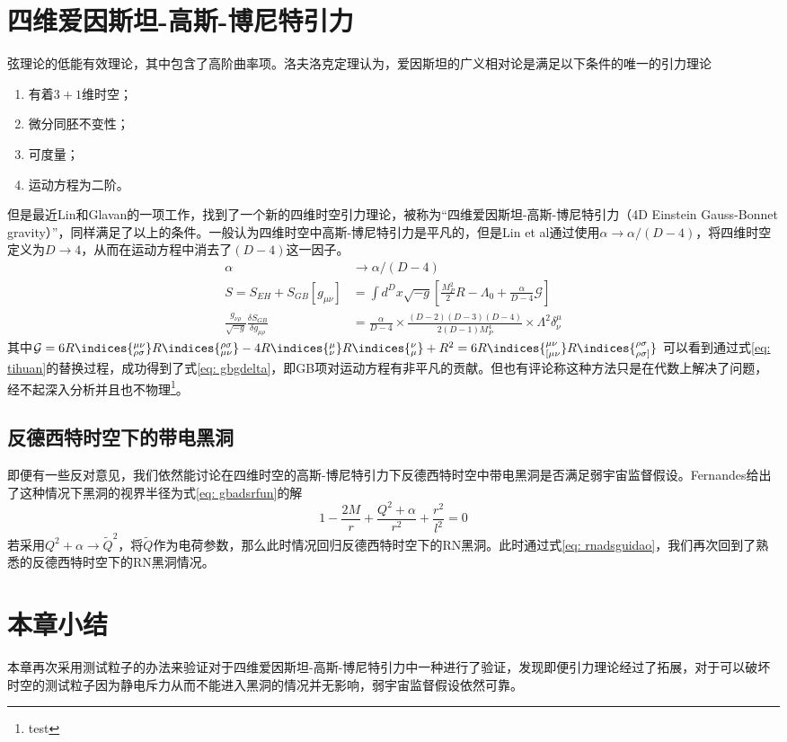\section{四维爱因斯坦-高斯-博尼特引力}
弦理论的低能有效理论，其中包含了高阶曲率项。洛夫洛克定理认为，爱因斯坦的广义相对论是满足以下条件的唯一的引力理论\citep{lanczos1938remarkable,lovelock1971einstein,lovelock1972four}
\begin{enumerate}
    \item 有着$3+1$维时空；
    \item 微分同胚不变性；
    \item 可度量；
    \item 运动方程为二阶。
\end{enumerate}

但是最近Lin和Glavan的一项工作，找到了一个新的四维时空引力理论，被称为“四维爱因斯坦-高斯-博尼特引力（4D Einstein Gauss-Bonnet gravity）”，同样满足了以上的条件\citep{glavan2020einstein}。一般认为四维时空中高斯-博尼特引力是平凡的，但是Lin et al通过使用$\alpha\rightarrow \alpha/\left(D-4\right)$，将四维时空定义为$D\rightarrow 4$，从而在运动方程中消去了$\left(D-4\right)$这一因子。
\begin{align}
    \alpha&\rightarrow \alpha/\left(D-4\right) \label{eq: tihuan} \\
    S=S_{EH}+S_{GB}\left[g_{\mu \nu}\right]&=\int d^Dx\sqrt{-g} \left[\frac{M_P^2}{2}R-\Lambda_0+\frac{\alpha}{D-4}\mathcal{G}\right] \\
    \frac{g_{\nu \rho}}{\sqrt{-g}}\frac{\delta S_{GB}}{\delta g_{\mu \rho}}&=\frac{\alpha}{D-4} \times \frac{\left(D-2\right)\left(D-3\right)\left(D-4\right)}{2\left(D-1\right)M_P^4}\times \Lambda^2 \delta^\mu_\nu \label{eq: gbgdelta}
\end{align}
其中$\mathcal{G}=6R\indices{^{\mu \nu}_{\rho \sigma}}R\indices{^{\rho \sigma}_{\mu \nu}}-4R\indices{^{\mu}_{\nu}}R\indices{^{\nu}_{\mu}}+R^2=6R\indices{^{\mu \nu}_{[\mu \nu}}R\indices{^{\rho \sigma}_{\rho \sigma]}}$
可以看到通过式\eqref{eq: tihuan}的替换过程，成功得到了式\eqref{eq: gbgdelta}，即GB项对运动方程有非平凡的贡献。但也有评论称这种方法只是在代数上解决了问题，经不起深入分析并且也不物理\footnote[1]{test}。
\subsection{反德西特时空下的带电黑洞}
即便有一些反对意见，我们依然能讨论在四维时空的高斯-博尼特引力下反德西特时空中带电黑洞是否满足弱宇宙监督假设。Fernandes给出了这种情况下黑洞的视界半径为式\eqref{eq: gbadsrfun}的解\citep{fernandes2020charged}
\begin{equation}\label{eq: gbadsrfun}
    1-\frac{2M}{r}+\frac{Q^2+\alpha}{r^2}+\frac{r^2}{l^2}=0
\end{equation}
若采用$Q^2+\alpha \rightarrow \tilde{Q}^2 $，将$\tilde{Q}$作为电荷参数，那么此时情况回归反德西特时空下的RN黑洞。此时通过式\eqref{eq: rnadsguidao}，我们再次回到了熟悉的反德西特时空下的RN黑洞情况。

\section{本章小结}
本章再次采用测试粒子的办法来验证对于四维爱因斯坦-高斯-博尼特引力中一种进行了验证，发现即便引力理论经过了拓展，对于可以破坏时空的测试粒子因为静电斥力从而不能进入黑洞的情况并无影响，弱宇宙监督假设依然可靠。